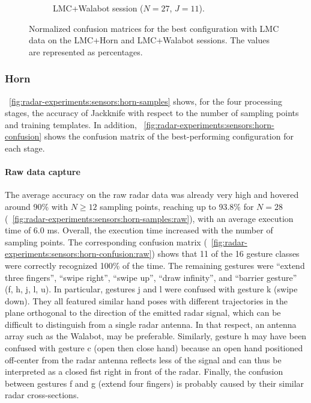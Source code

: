 \begin{figure}[t]
\begin{subfigure}{.49\textwidth}
        \vspace{-16pt}
        \captionsetup{width=.99\linewidth}
        \caption{LMC+Walabot session ($N{=}27$, $J{=}11$).}
        \label{fig:radar-experiments:sensors:lmc-confusion:walabot}
    \end{subfigure}
    \caption{Normalized confusion matrices for the best configuration with LMC data on the LMC+Horn and LMC+Walabot sessions. The values are represented as percentages.}
    \label{fig:radar-experiments:sensors:lmc-confusion}
\end{figure}


\subsubsection{Horn} \label{sec:radar-experiments:sensors:results:horn}
\fig~\ref{fig:radar-experiments:sensors:horn-samples} shows, for the four processing stages, the accuracy of Jackknife with respect to the number of sampling points and training templates. In addition, \fig~\ref{fig:radar-experiments:sensors:horn-confusion} shows the confusion matrix of the best-performing configuration for each stage.


\paragraph{Raw data capture}
The average accuracy on the raw radar data was already very high and hovered around 90\% with $N{\ge}12$ sampling points, reaching up to 93.8\% for $N{=}28$ (\fig~\ref{fig:radar-experiments:sensors:horn-samples:raw}), with an average execution time of 6.0 ms. Overall, the execution time increased with the number of sampling points. 
%
The corresponding confusion matrix (\fig~\ref{fig:radar-experiments:sensors:horn-confusion:raw}) shows that 11 of the 16 gesture classes were correctly recognized 100\% of the time. The remaining gestures were ``extend three fingers'', ``swipe right'', ``swipe up'', ``draw infinity'', and ``barrier gesture'' (f, h, j, l, u). 
%
In particular, gestures j and l were confused with gesture k (swipe down). They all featured similar hand poses with different trajectories in the plane orthogonal to the direction of the emitted radar signal, which can be difficult to distinguish from a single radar antenna. In that respect, an antenna array such as the Walabot, may be preferable.
%
Similarly, gesture h may have been confused with gesture c (open then close hand) because an open hand positioned off-center from the radar antenna reflects less of the signal and can thus be interpreted as a closed fist right in front of the radar.
%
Finally, the confusion between gestures f and g (extend four fingers) is probably caused by their similar radar cross-sections.


